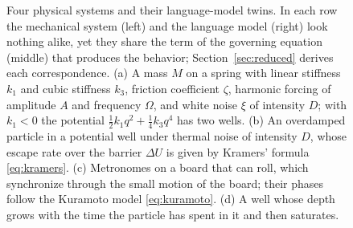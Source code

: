 \begin{figure}[!t]
{}
\caption{Four physical systems and their language-model twins. In each row the mechanical system (left) and the language model (right) look nothing alike, yet they share the term of the governing equation (middle) that produces the behavior; Section~\ref{sec:reduced} derives each correspondence. (a) A mass $M$ on a spring with linear stiffness $k_1$ and cubic stiffness $k_3$, friction coefficient $\zeta$, harmonic forcing of amplitude $A$ and frequency $\Omega$, and white noise $\xi$ of intensity $D$; with $k_1<0$ the potential $\tfrac12k_1q^2+\tfrac14k_3q^4$ has two wells. (b) An overdamped particle in a potential well under thermal noise of intensity $D$, whose escape rate over the barrier $\Delta U$ is given by Kramers' formula \eqref{eq:kramers}. (c) Metronomes on a board that can roll, which synchronize through the small motion of the board; their phases follow the Kuramoto model \eqref{eq:kuramoto}. (d) A well whose depth grows with the time the particle has spent in it and then saturates.}
\label{fig:models}
\end{figure}
